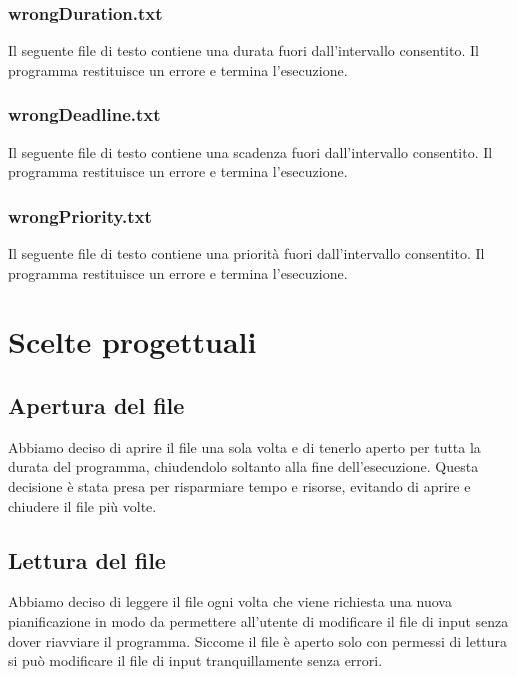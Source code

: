 \documentclass[a4paper]{article}
\begin{document}
\subsubsection{wrongDuration.txt}
Il seguente file di testo contiene una durata fuori dall'intervallo consentito. Il
programma restituisce un errore e termina l'esecuzione.

\subsubsection{wrongDeadline.txt}
Il seguente file di testo contiene una scadenza fuori dall'intervallo consentito. Il
programma restituisce un errore e termina l'esecuzione.

\subsubsection{wrongPriority.txt}
Il seguente file di testo contiene una priorità fuori dall'intervallo consentito. Il
programma restituisce un errore e termina l'esecuzione.

\section{Scelte progettuali}
\subsection{Apertura del file}
Abbiamo deciso di aprire il file una sola volta e di tenerlo aperto per tutta la durata
del programma, chiudendolo soltanto alla fine dell'esecuzione. Questa decisione è stata
presa per risparmiare tempo e risorse, evitando di aprire e chiudere il file più volte.

\subsection{Lettura del file}
Abbiamo deciso di leggere il file ogni volta che viene richiesta una nuova pianificazione
in modo da permettere all'utente di modificare il file di input senza dover riavviare il
programma. Siccome il file è aperto solo con permessi di lettura si può modificare il
file di input tranquillamente senza errori.
\end{document}
